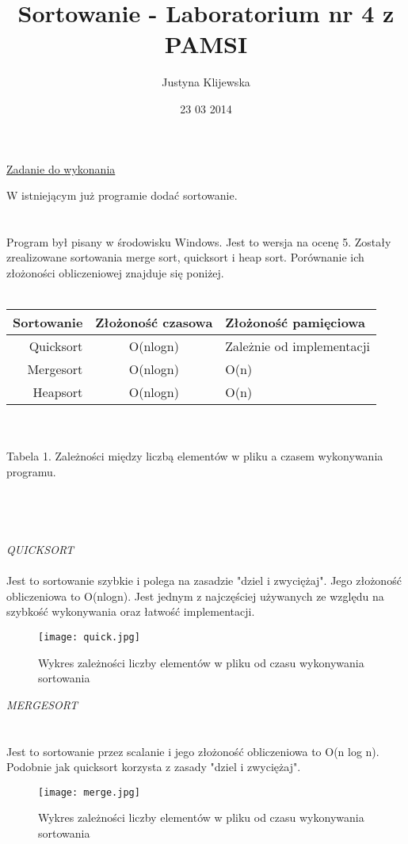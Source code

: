 \documentclass[11pt]{article}
\begin{document}
\begin{titlepage}
\title{Sortowanie - Laboratorium nr 4 z PAMSI}
\author{Justyna Klijewska}
\date{23 03 2014}
\maketitle
\end{titlepage}

\underline{Zadanie do wykonania}

W istniejącym już programie dodać sortowanie.
\\ \\ \\
Program był pisany w środowisku Windows. Jest to wersja na ocenę 5. Zostały zrealizowane sortowania merge sort, quicksort i heap sort. Porównanie ich złożoności obliczeniowej znajduje się poniżej. \\ \\
\begin{tabular}{|r|c|l|}
  \hline 
  Sortowanie & Złożoność czasowa & Złożoność pamięciowa \\
  \hline
  Quicksort & O(nlogn) & Zależnie od implementacji \\
  \hline
  Mergesort & O(nlogn) & O(n) \\
  \hline
  Heapsort & O(nlogn) &	O(n) \\
  \hline
\end{tabular} 
\\ \\ Tabela 1. Zależności między liczbą elementów w pliku a czasem wykonywania programu.
\\
\\ \\ \\ \\ 
\textit{QUICKSORT}
\\ \\
Jest to sortowanie szybkie i polega na zasadzie "dziel i zwyciężaj". Jego złożoność obliczeniowa to O(nlogn). Jest jednym z najczęściej używanych ze względu na szybkość wykonywania oraz łatwość implementacji. \\

\begin{figure}[ht!]
\centering
\texttt{[image: quick.jpg]}
\caption{Wykres zależności liczby elementów w pliku od czasu wykonywania sortowania}
\label{overflow}
\end{figure}


\textit{MERGESORT }
\\ \\ \\
Jest to sortowanie przez scalanie i jego złożoność obliczeniowa to O(n log n). Podobnie jak quicksort korzysta z zasady "dziel i zwyciężaj".
\\
\begin{figure}[ht!]
\centering
\texttt{[image: merge.jpg]}
\caption{Wykres zależności liczby elementów w pliku od czasu wykonywania sortowania}
\label{overflow}
\end{figure}
\end{document}
